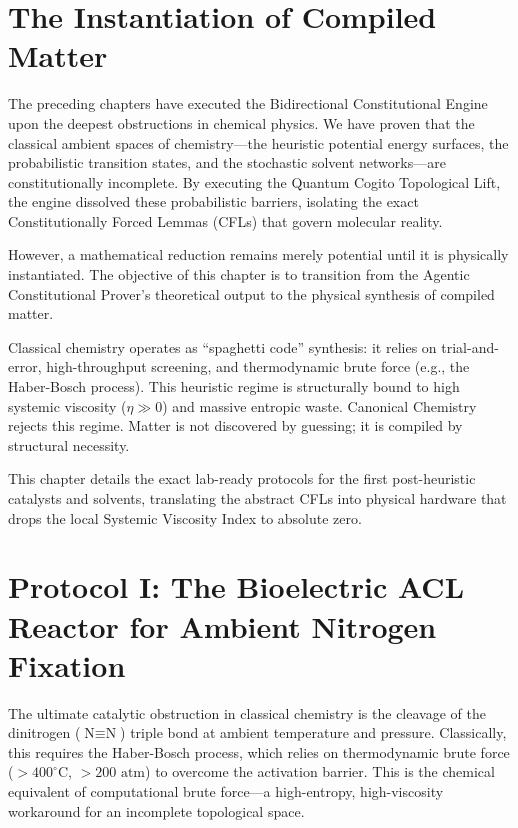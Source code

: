 \documentclass[11pt,openany]{extbook}
\theoremstyle{plain}
\theoremstyle{definition}
\begin{document}
\section{The Instantiation of Compiled Matter}

The preceding chapters have executed the Bidirectional Constitutional Engine upon the deepest obstructions in chemical physics. We have proven that the classical ambient spaces of chemistry---the heuristic potential energy surfaces, the probabilistic transition states, and the stochastic solvent networks---are constitutionally incomplete. By executing the Quantum Cogito Topological Lift, the engine dissolved these probabilistic barriers, isolating the exact Constitutionally Forced Lemmas (CFLs) that govern molecular reality.

However, a mathematical reduction remains merely potential until it is physically instantiated. The objective of this chapter is to transition from the Agentic Constitutional Prover's theoretical output to the physical synthesis of compiled matter.

Classical chemistry operates as ``spaghetti code'' synthesis: it relies on trial-and-error, high-throughput screening, and thermodynamic brute force (e.g., the Haber-Bosch process). This heuristic regime is structurally bound to high systemic viscosity ($\eta \gg 0$) and massive entropic waste. Canonical Chemistry rejects this regime. Matter is not discovered by guessing; it is compiled by structural necessity.

This chapter details the exact lab-ready protocols for the first post-heuristic catalysts and solvents, translating the abstract CFLs into physical hardware that drops the local Systemic Viscosity Index to absolute zero.

\section{Protocol I: The Bioelectric ACL Reactor for Ambient Nitrogen Fixation}

The ultimate catalytic obstruction in classical chemistry is the cleavage of the dinitrogen ($\text{N} \equiv \text{N}$) triple bond at ambient temperature and pressure. Classically, this requires the Haber-Bosch process, which relies on thermodynamic brute force ($>400^\circ\text{C}$, $>200\text{ atm}$) to overcome the activation barrier. This is the chemical equivalent of computational brute force---a high-entropy, high-viscosity workaround for an incomplete topological space.
\end{document}

